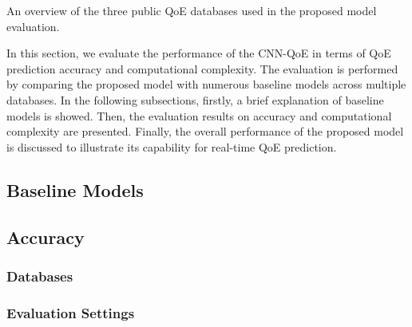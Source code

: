\begin{table*}[!t]
  \caption{An overview of the three public QoE databases used in the proposed model evaluation.}
  \label{tbl:Database}
  \centering
  
\end{table*}

In this section, we evaluate the performance of the CNN-QoE in terms of QoE prediction accuracy and computational complexity.
The evaluation is performed by comparing the proposed model with numerous baseline models across multiple databases.
In the following subsections, firstly, a brief explanation of baseline models is showed.
Then, the evaluation results on accuracy and computational complexity are presented.
Finally, the overall performance of the proposed model is discussed to illustrate its capability for real-time QoE prediction.



\subsection{Baseline Models}
\label{sec:Evaluation_BaselineModels}


% 


\subsection{Accuracy}
\label{sec:EvaluationAccuracy}

  \subsubsection{Databases}
  \label{sec:EvaluationAccuracy_Databases}
  

  \subsubsection{Evaluation Settings}
  \label{sec:EvaluationAccuracy_Settings}
  
  
